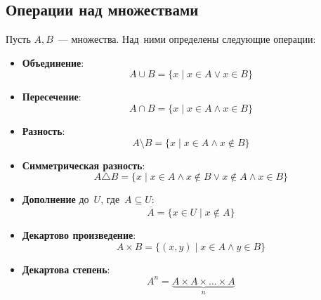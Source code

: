 \subsection{Операции над множествами}
Пусть $A, B$~--- множества. Над~ними определены следующие операции:
\begin{itemize}
	\item \textbf{Объединение}:
	\[ A \cup B = \{ x \mid x \in A \lor x \in B \} \]
	\item \textbf{Пересечение}:
	\[ A \cap B = \{ x \mid x \in A \land x \in B \} \]
	\item \textbf{Разность}:
	\[ A \setminus B = \{ x \mid x \in A \land x \notin B \} \]
	\item \textbf{Симметрическая разность}:
	\[ A \triangle B = \{ x \mid x \in A \land x \notin B \lor x \notin A \land x \in B \} \]
	\item \textbf{Дополнение} до~$U$, где~$A \subseteq U$:
	\[ \overline A = \{ x \in U \mid x \notin A \} \]
	\item \textbf{Декартово произведение}:
	\[ A \times B = \{ (x, y) \mid x \in A \land y \in B \} \]
	\item \textbf{Декартова степень}:
	\[ A^n = \underbrace{A \times A \times \ldots \times A}_n \]
\end{itemize}